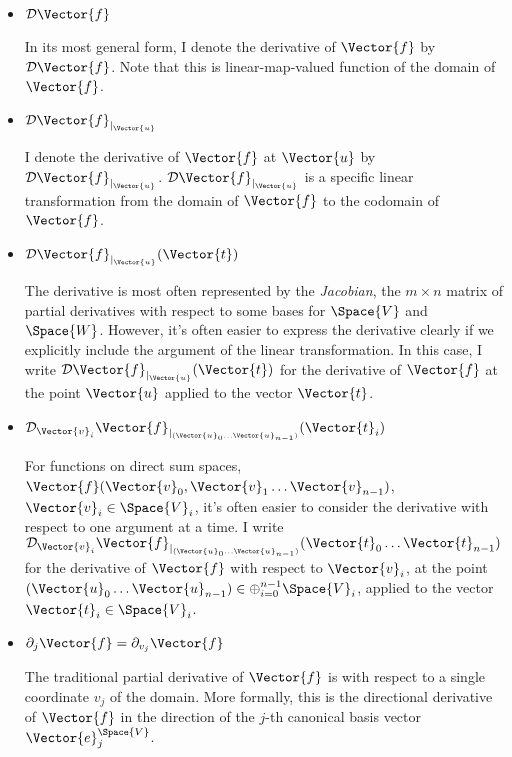 \begin{itemize}

\item $\Da{\Vector{f}}$

In its most general form,
I denote the derivative of $\Vector{f}$ by $\Da{\Vector{f}}$.
Note that this is linear-map-valued function of the domain of $\Vector{f}$.

\item $\Db{\Vector{f}}{\Vector{u}}$

I denote the derivative of $\Vector{f}$ at $\Vector{u}$ by $\Db{\Vector{f}}{\Vector{u}}$.
$\Db{\Vector{f}}{\Vector{u}}$ is a specific linear transformation from
the domain of $\Vector{f}$ to the codomain of $\Vector{f}$.

\item $\Dc{\Vector{f}}{\Vector{u}}{\Vector{t}}$

The derivative is most often represented by the {\it Jacobian},
the $m \times n$ matrix of partial derivatives
with respect to some bases for $\Space{V}$ and $\Space{W}$.
However, it's often easier to express the derivative clearly if we
explicitly include the argument of the linear transformation.
In this case, I write $\Dc{\Vector{f}}{\Vector{u}}{\Vector{t}}$
for the derivative of $\Vector{f}$ at the point $\Vector{u}$
applied to the vector $\Vector{t}$.

\item $\Dd{\Vector{v}_i}{\Vector{f}}{(\Vector{u}_0 \ldots \Vector{u}_{n-1})}{\Vector{t}_i}$

For functions on direct sum spaces,
$\Vector{f}(\Vector{v}_0,\Vector{v}_1 \ldots \Vector{v}_{n-1})$, $\Vector{v}_i \in \Space{V}_i$,
it's often easier to consider the derivative
with respect to one argument at a time.
I write $\Dd{\Vector{v}_i}{\Vector{f}}{(\Vector{u}_0 \ldots \Vector{u}_{n-1})}{\Vector{t}_0 \ldots \Vector{t}_{n-1}}$
for the derivative of $\Vector{f}$ with respect to $\Vector{v}_i$,
at the point $(\Vector{u}_0 \ldots \Vector{u}_{n-1}) \in \oplus_{i=0}^{n-1} \Space{V}_i$,
applied to the vector $\Vector{t}_i \in \Space{V}_i$.

\item $\da{j}{\Vector{f}} = \da{v_j}{\Vector{f}}$

The traditional partial derivative of $\Vector{f}$ is with respect to
a single coordinate $v_j$ of the domain.
More formally, this is the directional derivative of $\Vector{f}$
in the direction of the $j$-th canonical basis vector $\Vector{e}_j^{\Space{V}}$.


\end{itemize}
